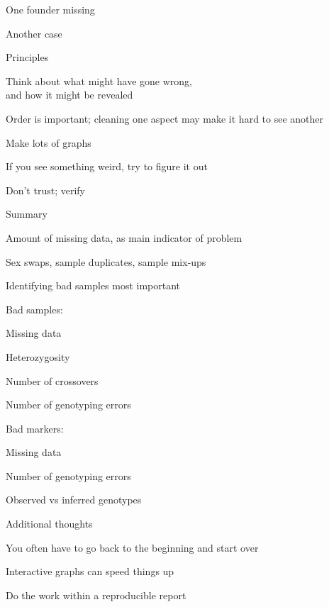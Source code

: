 \documentclass[aspectratio=169,12pt,t]{beamer}
\begin{document}
\begin{frame}[c]{One founder missing}

\note{
}
\end{frame}


\begin{frame}[c]{Another case}

\note{
}
\end{frame}


\begin{frame}[c]{Principles}

  \bbi
\item Think about what might have gone wrong, \\
  and how it might be revealed

 \item Order is important; cleaning one aspect may make it hard to see
   another

 \item Make lots of graphs

 \item If you see something weird, try to figure it out

 \item Don't trust; verify

   \ei

\note{
}

\end{frame}






\begin{frame}[c]{Summary}

  \bbi
\item Amount of missing data, as main indicator of problem
\item Sex swaps, sample duplicates, sample mix-ups
\item Identifying bad samples most important
\item Bad samples:
  \bi
\item Missing data
\item Heterozygosity
\item Number of crossovers
\item Number of genotyping errors
  \ei
\item Bad markers:
  \bi
\item Missing data
\item Number of genotyping errors
\item Observed vs inferred genotypes
  \ei
  \ei

\note{
}

\end{frame}




\begin{frame}[c]{Additional thoughts}

  \bbi
\item You often have to go back to the beginning and start over
\item Interactive graphs can speed things up
\item Do the work within a reproducible report
  \ei

\note{
}

\end{frame}
\end{document}
